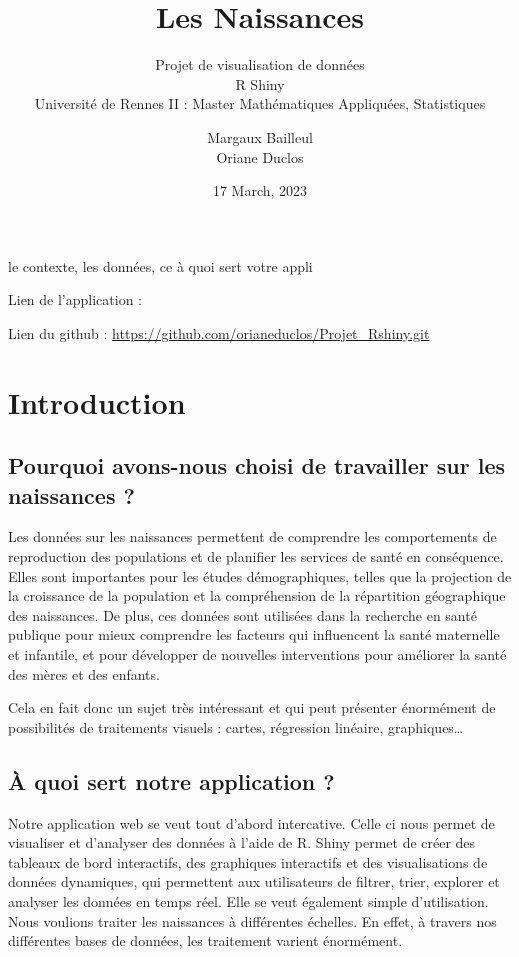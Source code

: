 \documentclass[
]{article}
\title{Les Naissances}
\subtitle{Projet de visualisation de données\\
R Shiny\\
Université de Rennes II : Master Mathématiques Appliquées, Statistiques}
\author{Margaux Bailleul\\
Oriane Duclos}
\date{17 March, 2023}
\begin{document}
\maketitle

{
\setcounter{tocdepth}{2}
\tableofcontents
}
le contexte, les données, ce à quoi sert votre appli

Lien de l'application :

Lien du github : \url{https://github.com/orianeduclos/Projet_Rshiny.git}

\hypertarget{introduction}{%
\section{Introduction}\label{introduction}}

\hypertarget{pourquoi-avons-nous-choisi-de-travailler-sur-les-naissances}{%
\subsection{Pourquoi avons-nous choisi de travailler sur les naissances
?}\label{pourquoi-avons-nous-choisi-de-travailler-sur-les-naissances}}

Les données sur les naissances permettent de comprendre les
comportements de reproduction des populations et de planifier les
services de santé en conséquence. Elles sont importantes pour les études
démographiques, telles que la projection de la croissance de la
population et la compréhension de la répartition géographique des
naissances. De plus, ces données sont utilisées dans la recherche en
santé publique pour mieux comprendre les facteurs qui influencent la
santé maternelle et infantile, et pour développer de nouvelles
interventions pour améliorer la santé des mères et des enfants.

Cela en fait donc un sujet très intéressant et qui peut présenter
énormément de possibilités de traitements visuels : cartes, régression
linéaire, graphiques\ldots{}

\hypertarget{uxe0-quoi-sert-notre-application}{%
\subsection{À quoi sert notre application
?}\label{uxe0-quoi-sert-notre-application}}

Notre application web se veut tout d'abord intercative. Celle ci nous
permet de visualiser et d'analyser des données à l'aide de R. Shiny
permet de créer des tableaux de bord interactifs, des graphiques
interactifs et des visualisations de données dynamiques, qui permettent
aux utilisateurs de filtrer, trier, explorer et analyser les données en
temps réel. Elle se veut également simple d'utilisation. Nous voulions
traiter les naissances à différentes échelles. En effet, à travers nos
différentes bases de données, les traitement varient énormément.
\end{document}
